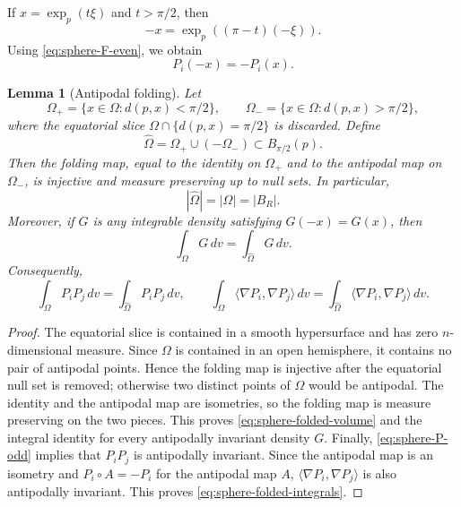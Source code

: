 \documentclass[11pt]{amsart}
\newtheorem{lemma}[theorem]{Lemma}
\theoremstyle{remark}
\begin{document}
If $x=\exp_p(t\xi)$ and $t>\pi/2$, then
$$
        -x=\exp_p((\pi-t)(-\xi)).
$$
Using \eqref{eq:sphere-F-even}, we obtain
\begin{equation}\label{eq:sphere-P-odd}
        P_i(-x)=-P_i(x).
\end{equation}

\begin{lemma}[Antipodal folding]\label{lem:sphere-folding}
Let
$$
        \Omega_+=\{x\in\Omega:d(p,x)<\pi/2\},
        \qquad
        \Omega_-=\{x\in\Omega:d(p,x)>\pi/2\},
$$
where the equatorial slice $\Omega\cap\{d(p,x)=\pi/2\}$ is discarded.  Define
\begin{equation}\label{eq:sphere-folded-domain}
        \widehat\Omega=\Omega_+\cup(-\Omega_-)
        \subset B_{\pi/2}(p).
\end{equation}
Then the folding map, equal to the identity on $\Omega_+$ and to the antipodal map on $\Omega_-$, is injective and measure preserving up to null sets.  In particular,
\begin{equation}\label{eq:sphere-folded-volume}
        |\widehat\Omega|=|\Omega|=|B_R|.
\end{equation}
Moreover, if $G$ is any integrable density satisfying $G(-x)=G(x)$, then
$$
        \int_\Omega G\,dv=\int_{\widehat\Omega}G\,dv.
$$
Consequently,
\begin{equation}\label{eq:sphere-folded-integrals}
        \int_\Omega P_iP_j\,dv
        =\int_{\widehat\Omega}P_iP_j\,dv,
        \qquad
        \int_\Omega\langle\nabla P_i,\nabla P_j\rangle\,dv
        =\int_{\widehat\Omega}\langle\nabla P_i,\nabla P_j\rangle\,dv.
\end{equation}
\end{lemma}

\begin{proof}
The equatorial slice is contained in a smooth hypersurface and has zero $n$-dimensional measure.  Since $\Omega$ is contained in an open hemisphere, it contains no pair of antipodal points.  Hence the folding map is injective after the equatorial null set is removed; otherwise two distinct points of $\Omega$ would be antipodal.  The identity and the antipodal map are isometries, so the folding map is measure preserving on the two pieces.  This proves \eqref{eq:sphere-folded-volume} and the integral identity for every antipodally invariant density $G$.  Finally, \eqref{eq:sphere-P-odd} implies that $P_iP_j$ is antipodally invariant.  Since the antipodal map is an isometry and $P_i\circ A=-P_i$ for the antipodal map $A$,  $\langle\nabla P_i,\nabla P_j\rangle$ is also antipodally invariant.  This proves \eqref{eq:sphere-folded-integrals}.
\end{proof}
\end{document}
